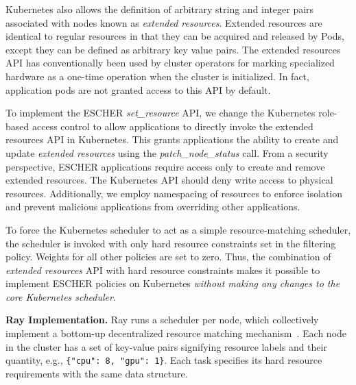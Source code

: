 Kubernetes also allows the definition of arbitrary string and integer pairs associated with nodes known as \textit{extended resources}. Extended resources are identical to regular resources in that they can be acquired and released by Pods, except they can be defined as arbitrary key value pairs.
The extended resources API has conventionally been used by cluster operators for marking specialized hardware as a one-time operation when the cluster is initialized. In fact, application pods are not granted access to this API by default.  

To implement the ESCHER \textit{set\_resource} API, we change the Kubernetes role-based access control to allow applications to directly invoke the extended resources API in Kubernetes. This grants applications the ability to create and update \textit{extended resources} using the \textit{patch\_node\_status} call.
From a security perspective, ESCHER applications require access only to create and remove extended resources. The Kubernetes API should deny write access to physical resources. Additionally, we employ namespacing of resources to enforce isolation and prevent malicious applications from overriding other applications.

To force the Kubernetes scheduler to act as a simple resource-matching scheduler, the scheduler is invoked with only hard resource constraints set in the filtering policy. Weights for all other policies are set to zero. Thus, the combination of \textit{extended resources} API with hard resource constraints makes it possible to implement ESCHER policies on Kubernetes \emph{without making any changes to the core Kubernetes scheduler}.


\noindent\textbf{Ray Implementation.}
Ray runs a scheduler per node, which collectively implement a bottom-up decentralized resource matching mechanism~\cite{ray}. Each node in the cluster has a set of key-value pairs signifying resource labels and their quantity, e.g., \texttt{\{"cpu": 8, "gpu": 1\}}.
Each task specifies its hard resource requirements with the same data structure.

